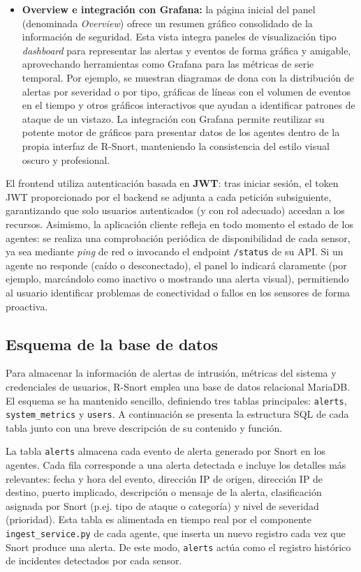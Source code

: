 \documentclass[11pt,a4paper,twoside]{report}
\begin{document}
\begin{itemize}
	\item \textbf{Overview e integración con Grafana:} la página inicial del panel (denominada \emph{Overview}) ofrece un resumen gráfico consolidado de la información de seguridad. Esta vista integra paneles de visualización tipo \emph{dashboard} para representar las alertas y eventos de forma gráfica y amigable, aprovechando herramientas como Grafana para las métricas de serie temporal. Por ejemplo, se muestran diagramas de dona con la distribución de alertas por severidad o por tipo, gráficas de líneas con el volumen de eventos en el tiempo y otros gráficos interactivos que ayudan a identificar patrones de ataque de un vistazo. La integración con Grafana permite reutilizar su potente motor de gráficos para presentar datos de los agentes dentro de la propia interfaz de R-Snort, manteniendo la consistencia del estilo visual oscuro y profesional.
\end{itemize}

El frontend utiliza autenticación basada en \textbf{JWT}: tras iniciar sesión, el token JWT proporcionado por el backend se adjunta a cada petición subsiguiente, garantizando que solo usuarios autenticados (y con rol adecuado) accedan a los recursos. Asimismo, la aplicación cliente refleja en todo momento el estado de los agentes: se realiza una comprobación periódica de disponibilidad de cada sensor, ya sea mediante \emph{ping} de red o invocando el endpoint \texttt{/status} de su API. Si un agente no responde (caído o desconectado), el panel lo indicará claramente (por ejemplo, marcándolo como inactivo o mostrando una alerta visual), permitiendo al usuario identificar problemas de conectividad o fallos en los sensores de forma proactiva.

\subsection{Esquema de la base de datos}

Para almacenar la información de alertas de intrusión, métricas del sistema y credenciales de usuarios, R-Snort emplea una base de datos relacional MariaDB. El esquema se ha mantenido sencillo, definiendo tres tablas principales: \texttt{alerts}, \texttt{system\_metrics} y \texttt{users}. A continuación se presenta la estructura SQL de cada tabla junto con una breve descripción de su contenido y función.\newline

La tabla \texttt{alerts} almacena cada evento de alerta generado por Snort en los agentes. Cada fila corresponde a una alerta detectada e incluye los detalles más relevantes: fecha y hora del evento, dirección IP de origen, dirección IP de destino, puerto implicado, descripción o mensaje de la alerta, clasificación asignada por Snort (p.ej. tipo de ataque o categoría) y nivel de severidad (prioridad). Esta tabla es alimentada en tiempo real por el componente \texttt{ingest\_service.py} de cada agente, que inserta un nuevo registro cada vez que Snort produce una alerta. De este modo, \texttt{alerts} actúa como el registro histórico de incidentes detectados por cada sensor.\newline
\end{document}
